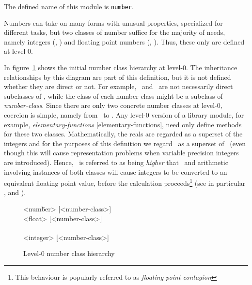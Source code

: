 \begin{optDefinition}
\noindent
The defined name of this module is {\tt number}.

Numbers can take on many forms with unusual properties, specialized for
different tasks, but two classes of number suffice for the majority of needs,
namely integers (, ) and floating point numbers
(, ).  Thus, these only are defined at
level-0.

In figure~\ref{level-0-number-class-hierarchy} shows the initial number class
hierarchy at level-0.  The inheritance relationships by this diagram are part of
this definition, but it is not defined whether they are direct or not.  For
example, \ and \ are not necessarily direct
subclasses of , while the class of each number class might be a
subclass of {\em number-class}.  Since there are only two concrete number
classes at level-0,
coercion is simple,
namely from \ to .  Any
level-0 version of a library module, for example, {\em elementary-functions}
\ref{elementary-functions}, need only define methods for these two classes.
Mathematically, the reals are regarded as a superset of the integers and for the
purposes of this definition we regard \ as a superset of
\ (even though this will cause representation problems when
variable precision integers are introduced).  Hence, \ is
referred to as being {\em higher} that \ and arithmetic
involving instances of both classes will cause integers to be converted to an
equivalent floating point value, before the calculation proceeds\footnote{This
    behaviour is popularly referred to as {\em floating point contagion}} (see
in particular ,
 and ).

\begin{figure}[h]
\caption{Level-0 number class hierarchy}
\label{level-0-number-class-hierarchy}
\begin{center}
{\tt\begin{tabbing}
<num\=ber> [<number-class>]\\
    \><flo\=at> [<number-class>]\\
    \>    \><double-float> [<number-class>]\\
    \\
    \>    
\end{tabbing}}
\end{center}
\end{figure}


\end{optDefinition}
